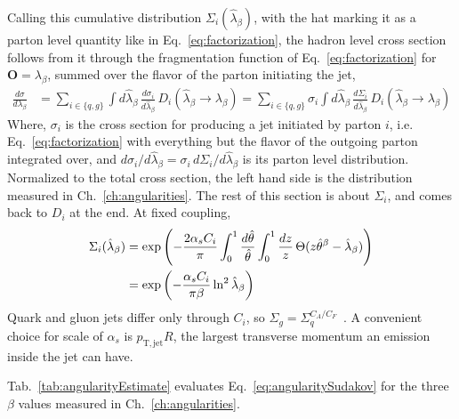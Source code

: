 %
Calling this cumulative distribution \(\Sigma_i(\hat{\lambda}_\beta)\), with the hat marking it as a parton level quantity like in Eq.~\ref{eq:factorization}, the hadron level cross section follows from it through the fragmentation function of Eq.~\ref{eq:factorization} for \(\mathbf{O} = \lambda_\beta\), summed over the flavor of the parton initiating the jet,
\begin{align}
	\frac{d\sigma}{d\lambda_\beta} &= \sum_{i \in \{q, g\}}\int d\hat{\lambda}_\beta\,\frac{d\sigma_i}{d\hat{\lambda}_\beta}\,D_i(\hat{\lambda}_\beta \to \lambda_\beta) = \sum_{i \in \{q, g\}}\sigma_i\int d\hat{\lambda}_\beta\,\frac{d\Sigma_i}{d\hat{\lambda}_\beta}\,D_i(\hat{\lambda}_\beta \to \lambda_\beta)
	\label{eq:angularityCumulant}
\end{align}
Where, \(\sigma_i\) is the cross section for producing a jet initiated by parton \(i\), i.e. Eq.~\ref{eq:factorization} with everything but the flavor of the outgoing parton integrated over, and \(d\sigma_i/d\hat{\lambda}_\beta = \sigma_i\,d\Sigma_i/d\hat{\lambda}_\beta\) is its parton level distribution. 
%
Normalized to the total cross section, the left hand side is the distribution measured in Ch.~\ref{ch:angularities}. 
%
The rest of this section is about \(\Sigma_i\), and comes back to \(D_i\) at the end. 
%
At fixed coupling,
\begin{align}
	\Sigma_i(\hat{\lambda}_\beta) &= \exp\left(-\frac{2\alpha_s C_i}{\pi}\int_0^1\frac{d\hat{\theta}}{\hat{\theta}}\int_0^1\frac{dz}{z}\,\Theta(z\hat{\theta}^\beta - \hat{\lambda}_\beta)\right) \notag\\
	&= \exp\left(-\frac{\alpha_s C_i}{\pi\beta}\ln^2\hat{\lambda}_\beta\right)
	\label{eq:angularitySudakov}
\end{align}
Quark and gluon jets differ only through \(C_i\), so \(\Sigma_g = \Sigma_q^{C_A/C_F}\)~\cite{Larkoski_2014}.
%
 A convenient choice for scale of \(\alpha_s\) is \(p_\mathrm{T, jet}R\), the largest transverse momentum an emission inside the jet can have. 
%

Tab.~\ref{tab:angularityEstimate} evaluates Eq.~\ref{eq:angularitySudakov} for the three \(\beta\) values measured in Ch.~\ref{ch:angularities}. 


